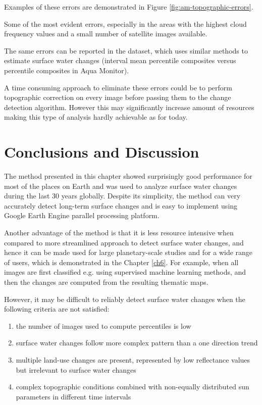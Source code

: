 Examples of these errors are demonstrated in Figure \ref{fig:am-topographic-errors}. 

Some of the most evident errors, especially in the areas with the highest cloud frequency values and a small number of satellite images available.

The same errors can be reported in the \citet{Hansen2013} dataset, which uses similar methods to estimate surface water changes (interval mean percentile composites versus percentile composites in Aqua Monitor).

A time consuming approach to eliminate these errors could be to perform topographic correction on every image before passing them to the change detection algorithm. However this may significantly increase amount of resources making this type of analysis hardly achievable as for today.


\section{Conclusions and Discussion}

The method presented in this chapter showed surprisingly good performance for most of the places on Earth and was used to analyze surface water changes during the last 30 years globally. Despite its simplicity, the method can very accurately detect long-term surface changes and is easy to implement using Google Earth Engine parallel processing platform.

Another advantage of the method is that it is less resource intensive when compared to more streamlined approach to detect surface water changes, and hence it can be made used for large planetary-scale studies and for a wide range of users, which is demonstrated in the Chapter \ref{ch6}. For example, when all images are first classified e.g. using supervised machine learning methods, and then the changes are computed from the resulting thematic maps.

However, it may be difficult to reliably detect surface water changes when the following criteria are not satisfied:

\begin{enumerate}[label=(\alph*)]
	\item \label{enum:changes-low-count} the number of images used to compute percentiles is low
	\item \label{enum:changes-complex-trend} surface water changes follow more complex pattern than a one direction trend
	\item \label{enum:changes-multple-classes} multiple land-use changes are present, represented by low reflectance values but irrelevant to surface water changes
	\item \label{enum:changes-topo} complex topographic conditions combined with non-equally distributed sun parameters in different time intervals
\end{enumerate}

